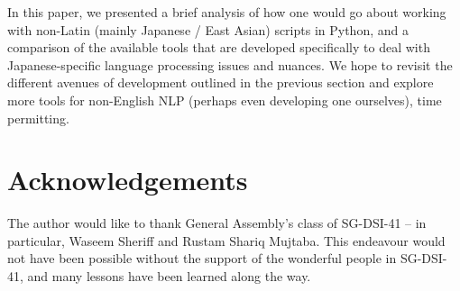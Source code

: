 \documentclass[12pt]{article}
\begin{document}
	In this paper, we presented a brief analysis of how one would go about working with non-Latin (mainly Japanese / East Asian) scripts in Python, and a comparison of the available tools that are developed specifically to deal with Japanese-specific language processing issues and nuances. We hope to revisit the different avenues of development outlined in the previous section and explore more tools for non-English NLP (perhaps even developing one ourselves), time permitting.
	
	\section{Acknowledgements}
	
	The author would like to thank General Assembly's class of SG-DSI-41 -- in particular, Waseem Sheriff and Rustam Shariq Mujtaba. This endeavour would not have been possible without the support of the wonderful people in SG-DSI-41, and many lessons have been learned along the way.
	
	
	
	
\end{document}
